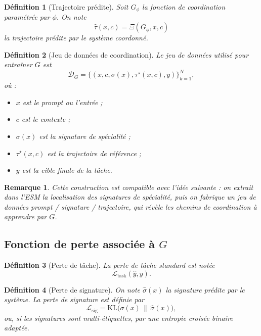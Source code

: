 \documentclass[11pt,a4paper]{article}
\newtheorem{definition}{Définition}[section]
\newtheorem{remark}{Remarque}[section]
\newcommand{\1}{\mathbf 1}
\begin{document}
\begin{definition}[Trajectoire prédite]
Soit \(G_\phi\) la fonction de coordination paramétrée par \(\phi\).
On note
\[
\widehat{\tau}(x,c)=\Xi(G_\phi,x,c)
\]
la trajectoire prédite par le système coordonné.
\end{definition}

\begin{definition}[Jeu de données de coordination]
Le jeu de données utilisé pour entraîner \(G\) est
\[
\mathcal D_G
=
\bigl\{
(x,c,\sigma(x),\tau^\star(x,c),y)
\bigr\}_{k=1}^N,
\]
où :
\begin{itemize}[leftmargin=2em]
    \item \(x\) est le prompt ou l'entrée ;
    \item \(c\) est le contexte ;
    \item \(\sigma(x)\) est la signature de spécialité ;
    \item \(\tau^\star(x,c)\) est la trajectoire de référence ;
    \item \(y\) est la cible finale de la tâche.
\end{itemize}
\end{definition}

\begin{remark}
Cette construction est compatible avec l'idée suivante :
on extrait dans l'ESM la localisation des signatures de spécialité,
puis on fabrique un jeu de données prompt / signature / trajectoire,
qui révèle les chemins de coordination à apprendre par \(G\).
\end{remark}

\subsection{Fonction de perte associée à \(G\)}

\begin{definition}[Perte de tâche]
La perte de tâche standard est notée
\[
\mathcal L_{\mathrm{task}}(\hat y,y).
\]
\end{definition}

\begin{definition}[Perte de signature]
On note \(\widehat\sigma(x)\) la signature prédite par le système.
La perte de signature est définie par
\[
\mathcal L_{\mathrm{sig}}
=
\mathrm{KL}\!\bigl(\sigma(x)\,\|\,\widehat\sigma(x)\bigr),
\]
ou, si les signatures sont multi-étiquettes, par une entropie croisée binaire adaptée.
\end{definition}
\end{document}
